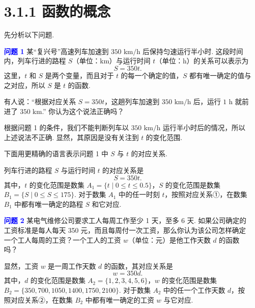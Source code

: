 \documentclass[a4paper,11pt]{ctexart}
\begin{document}
	
	\section*{3.1.1 函数的概念}
	
	先分析以下问题.
	
	\textcolor{blue}{\textbf{问题 1}} 某“复兴号”高速列车加速到 \(350\text{ km/h}\) 后保持匀速运行半小时. 这段时间内，列车行进的路程 \(S\)（单位：\(\text{km}\)）与运行时间 \(t\)（单位：\(\text{h}\)）的关系可以表示为
	\[
	S = 350t.
	\]
	这里，\(t\) 和 \(S\) 是两个变量，而且对于 \(t\) 的每一个确定的值，\(S\) 都有唯一确定的值与之对应，所以 \(S\) 是 \(t\) 的函数.
	
	\begin{thinkbox}[思考]
		有人说：“根据对应关系 \(S = 350t\)，这趟列车加速到 \(350\text{ km/h}\) 后，运行 \(1\text{ h}\) 就前进了 \(350\text{ km}\).” 你认为这个说法正确吗？
	\end{thinkbox}
	
	根据问题 1 的条件，我们不能判断列车以 \(350\text{ km/h}\) 运行半小时后的情况，所以上述说法不正确. 显然，其原因是没有关注到 \(t\) 的变化范围.
	
	下面用更精确的语言表示问题 1 中 \(S\) 与 \(t\) 的对应关系.
	
	列车行进的路程 \(S\) 与运行时间 \(t\) 的对应关系是
	\begin{equation}
		S = 350t. \tag{①}
	\end{equation}
	其中，\(t\) 的变化范围是数集 \(A_1 = \{t \mid 0 \leqslant t \leqslant 0.5\}\)，\(S\) 的变化范围是数集 \(B_1 = \{S \mid 0 \leqslant S \leqslant 175\}\). 对于数集 \(A_1\) 中的任一时刻 \(t\)，按照对应关系①，在数集 \(B_1\) 中都有唯一确定的路程 \(S\) 和它对应.
	
	
	
	\textcolor{blue}{\textbf{问题 2}} 某电气维修公司要求工人每周工作至少 1 天，至多 6 天. 如果公司确定的工资标准是每人每天 350 元，而且每周付一次工资，那么你认为该公司怎样确定一个工人每周的工资？一个工人的工资 \(w\)（单位：元）是他工作天数 \(d\) 的函数吗？
	
	显然，工资 \(w\) 是一周工作天数 \(d\) 的函数，其对应关系是
	\begin{equation}
		w = 350d. \tag{②}
	\end{equation}
	其中，\(d\) 的变化范围是数集 \(A_2 = \{1, 2, 3, 4, 5, 6\}\)，\(w\) 的变化范围是数集 \(B_2 = \{350, 700, 1050, 1400, 1750, 2100\}\). 对于数集 \(A_2\) 中的任一个工作天数 \(d\)，按照对应关系②，在数集 \(B_2\) 中都有唯一确定的工资 \(w\) 与它对应.
	
\end{document}

